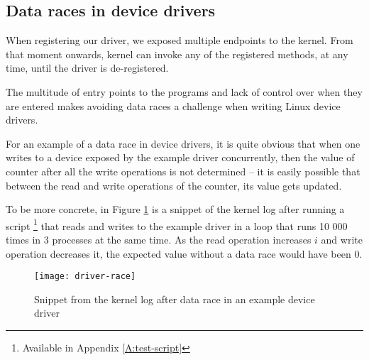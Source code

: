 \documentclass[..thesis.tex]{subfiles}
\begin{document}
\subsection{Data races in device drivers}


When registering our driver, we exposed multiple endpoints to the kernel. From that moment onwards, kernel can invoke any of the registered methods, at any time, until the driver is de-registered. 


The multitude of entry points to the programs and lack of control over when they are entered makes avoiding data races a challenge when writing Linux device drivers. 

For an example of a data race in device drivers, it is quite obvious that when one writes to a device exposed by the example driver concurrently, then the value of counter after all the write operations is not determined -- it is easily possible that between the read and write operations of the counter, its value gets updated.

To be more concrete, in Figure \ref{fig:driver-race} is a snippet of the kernel log after running a script \footnote{Available in Appendix \ref{A:test-script}} that reads and writes to the example driver in a loop that
runs 10 000 times in 3 processes at the same time. As the read operation increases $i$ and write operation decreases it, the expected value without a data race would have been $0$.




\begin{figure}[H]
\centering
\texttt{[image: driver-race]}
\caption{Snippet from the kernel log after data race in an example device driver}
\label{fig:driver-race}
\end{figure}


\end{document}
